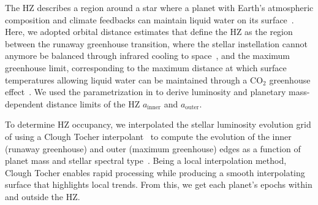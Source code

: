 \documentclass[twocolumn,twocolappendix,linenumbers]{aastex631}
\begin{document}
The \gls{HZ} describes a region around a star where a planet with Earth's atmospheric composition and climate feedbacks can maintain liquid water on its surface~\citep[e.g.,][]{Ramirez2017,Ramirez2018,MolLous2022,Spinelli2023,Tuchow2023}.
Here, we adopted orbital distance estimates that define the \gls{HZ} as the region between the runaway greenhouse transition, where the stellar instellation cannot anymore be balanced through infrared cooling to space~\citep{Ingersoll1969}, and the maximum greenhouse limit, corresponding to the maximum distance at which surface temperatures allowing liquid water can be maintained through a CO$_2$ greenhouse effect~\citep{Kasting1991,Kasting1993,Underwood2003,Kopparapu2013,Kopparapu2014}.
We used the parametrization in \citet{Kopparapu2014} to derive luminosity and planetary mass-dependent distance limits of the \gls{HZ} $a_\mathrm{inner}$ and $a_\mathrm{outer}$.


To determine \gls{HZ} occupancy, we interpolated the stellar luminosity evolution grid of \citet{Baraffe1998} using a Clough Tocher interpolant~\citep[][see left panel of Figure~\ref{fig:hz_nuv_evo}]{Nielson1983,Alfeld1984} to compute the evolution of the inner (runaway greenhouse) and outer (maximum greenhouse) edges as a function of planet mass and stellar spectral type~\citep{Kopparapu2014}.
Being a local interpolation method, Clough Tocher enables rapid processing while producing a smooth interpolating surface that highlights local trends.
From this, we get each planet's epochs within and outside the \gls{HZ}.
\end{document}
